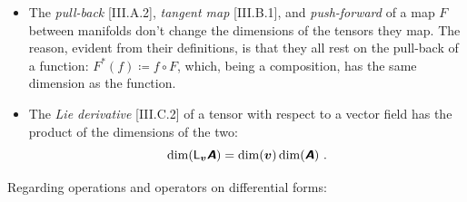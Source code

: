 \documentclass[\ifafour a4paper,12pt,\else a5paper,10pt,\fi%
onecolumn,oneside,article,%
british%
]{memoir}
\theoremstyle{remark}
\theoremstyle{innote}
\newcommand*{\mathte}[1]{\textbf{\textit{\textsf{#1}}}}
\newcommand*{\defd}{\coloneqq}
\renewcommand*{\|}[1][]{\nonscript\,#1\vert\nonscript\;\mathopen{}}
\newcommand*{\Li}{\textsf{L}}
\newcommand*{\yA}{\mathte{A}}
\newcommand*{\yB}{\mathte{B}}
\newcommand*{\yv}{\bm{v}}
\begin{document}
\begin{itemize}[wide=0pt]
\smallskip

\item The \emph{pull-back} [III.A.2], \emph{tangent map} [III.B.1], and
  \emph{push-forward} of a map $F$ between manifolds don't change the
  dimensions of the tensors they map. The reason, evident from their
  definitions, is that they all rest on the pull-back of a function:
  $F^{*}(f) \defd f\circ F$, which, being a composition, has the same
  dimension as the function.

\smallskip

\item The \emph{Lie derivative} [III.C.2] of a tensor with respect to a
  vector field has the product of the dimensions of the two:
  \begin{equation}
    \dim(\Li_{\yv}\yA) =\dim(\yv)\dim(\yA) \ .
    \label{eq:lie_der}
\end{equation}
\end{itemize}

\bigskip

Regarding operations and operators on differential forms:
\end{document}
